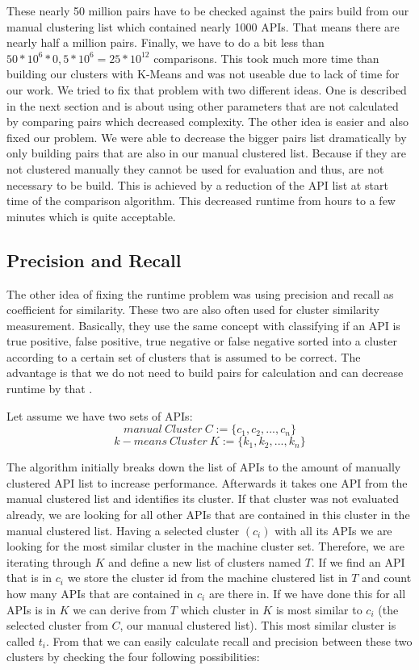 \documentclass[a4paper]{IEEEtran}
\begin{document}
These nearly 50 million pairs have to be checked against the pairs build from our manual clustering list which contained nearly 1000 APIs. That means there are  nearly half a million pairs. Finally, we have to do a bit less than $50*10^6*0,5*10^6=25*10^{12}$ comparisons. This took much more time than building our clusters with K-Means and was not useable due to lack of time for our work.
We tried to fix that problem with two different ideas. One is described in the next section and is about using other parameters that are not calculated by comparing pairs which decreased complexity. The other idea is easier and also fixed our problem. We were able to decrease the bigger pairs list dramatically by only building pairs that are also in our manual clustered list. Because if they are not clustered manually they cannot be used for evaluation and thus, are not necessary to be build. This is achieved by a reduction of the API list at start time of the comparison algorithm. This decreased runtime from hours to a few minutes which is quite acceptable.

\subsection{Precision and Recall}
The other idea of fixing the runtime problem was using precision and recall as coefficient for similarity. These two are also often used for cluster similarity measurement. Basically, they use the same concept with classifying if an API is true positive, false positive, true negative or false negative sorted into a cluster according to a certain set of clusters that is assumed to be correct. The advantage is that we do not need to build pairs for calculation and can decrease runtime by that \cite{powers2011evaluation}.

Let assume we have two sets of APIs:
\begin{equation*}
manual~Cluster~C := \{ c_1,c_2,...,c_n \}
\end{equation*}
\begin{equation*}
k-means~Cluster~K := \{ k_1,k_2,...,k_n \}
\end{equation*}

The algorithm initially breaks down the list of APIs to the amount of manually clustered API list to increase performance. 
Afterwards it takes one API from the manual clustered list and identifies its cluster. If that cluster was not evaluated already, we are looking for all other APIs that are contained in this cluster in the manual clustered list. Having a selected cluster $(c_i)$ with all its APIs we are looking for the most similar cluster in the machine cluster set. Therefore, we are iterating through $K$ and define a new list of clusters named $T$. If we find an API that is in $c_i$ we store the cluster id from the machine clustered list in $T$ and count how many APIs that are contained in $c_i$ are there in. If we have done this for all APIs is in $K$ we can derive from $T$ which cluster in $K$ is most similar to $c_i$ (the selected cluster from $C$, our manual clustered list). This most similar cluster is called $t_i$. From that we can easily calculate recall and precision between these two clusters by checking the four following possibilities:
\end{document}
